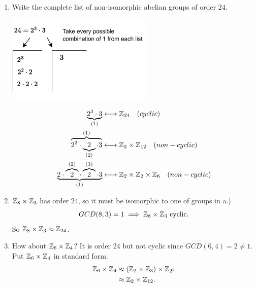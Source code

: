 \begin{example} 
\begin{enumerate}[label=\alph*.)]
    \item Write the complete list of non-isomorphic abelian groups of order $24$.
\begin{center}
    \includegraphics[width=0.55\textwidth]{Figures/24_factors.pdf}
\end{center}
\begin{align}
    \underbrace{2^3\cdot 3}_{(1)} &\longleftrightarrow \Z_{24} \ \ \ (cyclic) \nonumber \\
    \overbrace{2^2\cdot \underbrace{2}_{(2)}\cdot 3}^{(1)} &\longleftrightarrow \Z_{2}\times \Z_{12} \ \ \ (non-cyclic) \nonumber \\
    \underbrace{2\cdot \overbrace{2}^{(2)}\cdot \overbrace{2}^{(3)}\cdot 3}_{(1)} &\longleftrightarrow \Z_{2}\times \Z_2\times \Z_6 \ \ \ (non-cyclic) \nonumber 
\end{align}
\item ${\mathbb{ Z}}_8\times {\mathbb{ Z}}_3$ has order $24$, so it must be isomorphic to one of groups in a.)
\begin{align}
    GCD(8,3)=1 \implies {\mathbb{ Z}}_8\times {\mathbb{ Z}}_3 \text{ cyclic}. \nonumber
\end{align}
So ${\mathbb{ Z}}_8\times {\mathbb{ Z}}_3 \approx {\mathbb{ Z}}_{24}$.
\item How about ${\mathbb{ Z}}_6\times {\mathbb{ Z}}_4$? It is order $24$ but not cyclic since $GCD(6,4)=2\neq 1$. Put ${\mathbb{ Z}}_6\times {\mathbb{ Z}}_4$ in standard form:
\begin{align}
    {\mathbb{ Z}}_6\times {\mathbb{ Z}}_4 &\approx ({\mathbb{ Z}}_2\times {\mathbb{ Z}}_3)\times {\mathbb{ Z}}_{2^2} \nonumber \\
    &\approx {\mathbb{ Z}}_2\times {\mathbb{ Z}}_{12}. \nonumber
\end{align}
\end{enumerate}
\end{example}

